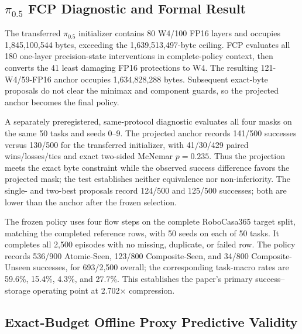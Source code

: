 \subsection{\texorpdfstring{$\pi_{0.5}$}{pi0.5} FCP Diagnostic and Formal Result}
\label{sec:pi05_fcp_diagnostic}

The transferred $\pi_{0.5}$ initializer contains 80 W4/100 FP16 layers and occupies 1,845,100,544 bytes, exceeding the 1,639,513,497-byte ceiling. FCP evaluates all 180 one-layer precision-state interventions in complete-policy context, then converts the 41 least damaging FP16 protections to W4. The resulting 121-W4/59-FP16 anchor occupies 1,634,828,288 bytes. Subsequent exact-byte proposals do not clear the minimax and component guards, so the projected anchor becomes the final policy.



A separately preregistered, same-protocol diagnostic evaluates all four masks on the same 50 tasks and seeds 0--9. The projected anchor records 141/500 successes versus 130/500 for the transferred initializer, with 41/30/429 paired wins/losses/ties and exact two-sided McNemar $p=0.235$. Thus the projection meets the exact byte constraint while the observed success difference favors the projected mask; the test establishes neither equivalence nor non-inferiority. The single- and two-best proposals record 124/500 and 125/500 successes; both are lower than the anchor after the frozen selection.

The frozen policy uses four flow steps on the complete RoboCasa365 target split, matching the completed reference rows, with 50 seeds on each of 50 tasks. It completes all 2,500 episodes with no missing, duplicate, or failed row. The policy records 536/900 Atomic-Seen, 123/800 Composite-Seen, and 34/800 Composite-Unseen successes, for 693/2,500 overall; the corresponding task-macro rates are 59.6\%, 15.4\%, 4.3\%, and 27.7\%. This establishes the paper's primary success--storage operating point at 2.702$\times$ compression.

\subsection{Exact-Budget Offline Proxy Predictive Validity}
\label{sec:predictive_validity}

